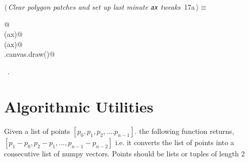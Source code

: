 \documentclass[11.5pt]{report}
\begin{document}
\begin{flushleft} \small
\begin{minipage}{\linewidth}\label{scrap10}\raggedright\small
{} $\langle\,${\itshape Clear polygon patches and set up last minute \verb|ax| tweaks}\nobreak\ {\footnotesize {17a}}$\,\rangle\equiv$
\vspace{-1ex}
\begin{list}{}{} \item
\mbox{}\verb@   @\\
\mbox{}\verb@clearAxPolygonPatches(ax)@\\
\mbox{}\verb@applyAxCorrection(ax)@\\
\mbox{}\verb@fig.canvas.draw()@\\
\mbox{}\verb@@{\NWsep}
\end{list}
\vspace{-1.5ex}
\footnotesize
\begin{list}{}{\setlength{\itemsep}{-\parsep}\setlength{\itemindent}{-\leftmargin}}
\item \NWtxtMacroRefIn\ .

\item{}
\end{list}
\end{minipage}\vspace{4ex}
\end{flushleft}

\section{Algorithmic Utilities}

\newchunk Given a list of  points $[p_0,p_1,p_2,....p_{n-1}]$. 
    the following function returns, $[p_1-p_0, p_2-p_1,...,p_{n-1}-p_{n-2}]$
    i.e. it converts the list of points into a consecutive list of numpy vectors. 
    Points should be lists or tuples of length 2
\end{document}
